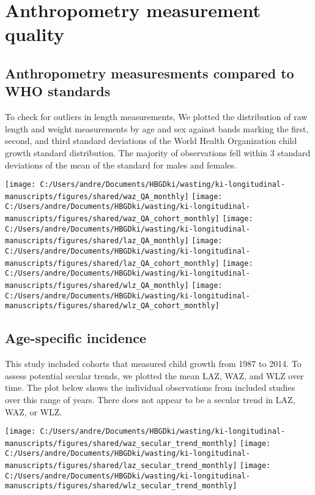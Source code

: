 \documentclass[
  9pt,
]{book}
\begin{document}
\hypertarget{anthro}{%
\chapter{Anthropometry measurement quality}\label{anthro}}

\raggedright

\hypertarget{anthropometry-measuresments-compared-to-who-standards}{%
\section{Anthropometry measuresments compared to WHO standards}\label{anthropometry-measuresments-compared-to-who-standards}}

To check for outliers in length measurements, We plotted the distribution of raw length and weight measurements by age and sex against bands marking the first, second, and third standard deviations of the World Health Organization child growth standard distribution. The majority of observations fell within 3 standard deviations of the mean of the standard for males and females.

\texttt{[image: C:/Users/andre/Documents/HBGDki/wasting/ki-longitudinal-manuscripts/figures/shared/waz\_QA\_monthly]}
\texttt{[image: C:/Users/andre/Documents/HBGDki/wasting/ki-longitudinal-manuscripts/figures/shared/waz\_QA\_cohort\_monthly]}
\texttt{[image: C:/Users/andre/Documents/HBGDki/wasting/ki-longitudinal-manuscripts/figures/shared/laz\_QA\_monthly]}
\texttt{[image: C:/Users/andre/Documents/HBGDki/wasting/ki-longitudinal-manuscripts/figures/shared/laz\_QA\_cohort\_monthly]}
\texttt{[image: C:/Users/andre/Documents/HBGDki/wasting/ki-longitudinal-manuscripts/figures/shared/wlz\_QA\_monthly]}
\texttt{[image: C:/Users/andre/Documents/HBGDki/wasting/ki-longitudinal-manuscripts/figures/shared/wlz\_QA\_cohort\_monthly]}

\hypertarget{age-specific-incidence-2}{%
\section{Age-specific incidence}\label{age-specific-incidence-2}}

This study included cohorts that measured child growth from 1987 to 2014. To assess potential secular trends, we plotted the mean LAZ, WAZ, and WLZ over time. The plot below shows the individual observations from included studies over this range of years. There does not appear to be a secular trend in LAZ, WAZ, or WLZ.

\texttt{[image: C:/Users/andre/Documents/HBGDki/wasting/ki-longitudinal-manuscripts/figures/shared/waz\_secular\_trend\_monthly]}
\texttt{[image: C:/Users/andre/Documents/HBGDki/wasting/ki-longitudinal-manuscripts/figures/shared/laz\_secular\_trend\_monthly]}
\texttt{[image: C:/Users/andre/Documents/HBGDki/wasting/ki-longitudinal-manuscripts/figures/shared/wlz\_secular\_trend\_monthly]}

  
\end{document}
